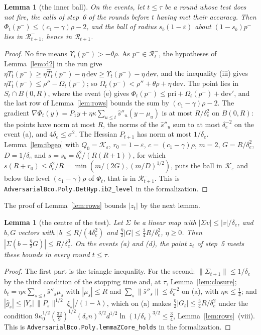 \documentclass[11pt]{amsart}
\newtheorem{lemma}[theorem]{Lemma}
\theoremstyle{definition}
\numberwithin{equation}{section}
\newcommand{\cK}{\mathcal{K}}
\begin{document}
\begin{lemma}[the inner ball]\label{lem:ib2}
On the events, let $t\le\tau$ be a round whose test does not fire, the calls of step~6 of the rounds before $t$ having met their accuracy. Then $\Phi_t(p^-)\le(c_1-\gamma)\rho-2$, and the ball of radius $s_b(1-\varepsilon)$ about $(1-s_b)p^-$ lies in $\mathcal R^-_{t+1}$, hence in $\mathcal R_{t+1}$.
\end{lemma}

\begin{proof}
No fire means $\Upsilon_t(p^-)>-\theta\rho$. As $p^-\in\mathcal R^-_t$, the hypotheses of Lemma~\ref{lem:d2} in the run give $\eta T_t(p^-)\ge\eta\hat T_t(p^-)-\eta\,\mathrm{dev}\ge\Upsilon_t(p^-)-\eta\,\mathrm{dev}$, and the inequality (iii) gives $\eta T_t(p^-)\le\rho''-\Omega_t(p^-)$; so $\Omega_t(p^-)<\rho''+\theta\rho+\eta\,\mathrm{dev}$. The point lies in $S_t\cap B(0,R)$, where the event (e) gives $\Phi_t(p^-)\le\mathrm{pri}+\Omega_t(p^-)+\mathrm{dev}'$, and the last row of Lemma~\ref{lem:rows} bounds the sum by $(c_1-\gamma)\rho-2$. The gradient $\nabla\Phi_t(y)=P_1y+\eta\kappa\sum_{u\le t}\hat s''_u(y-\mu_u)$ is at most $R/\delta_e^2$ on $B(0,R)$: the points have norm at most $R$, the norms of the $\hat s''_u$ sum to at most $\delta_e^{-2}$ on the event (a), and $4\delta_e\le\sigma^2$. The Hessian $P_{t+1}$ has norm at most $1/\delta_e$. Lemma~\ref{lem:ibgeo} with $Q_0=\cK_\varepsilon$, $r_0=1-\varepsilon$, $c=(c_1-\gamma)\rho$, $m=2$, $G=R/\delta_e^2$, $D=1/\delta_e$ and $s=s_b=\delta_e^2/(R(R+1))$, for which $s(R+r_0)\le\delta_e^2/R=\min(m/(2G),(m/D)^{1/2})$, puts the ball in $\cK_\varepsilon$ and below the level $(c_1-\gamma)\rho$ of $\Phi_t$, that is in $\mathcal R^-_{t+1}$.
This is \texttt{AdversarialBco.Poly.DetHyp.ib2\_level} in the formalization.
\end{proof}

The proof of Lemma~\ref{lem:rows} bounds $|z_t|$ by the next lemma.

\begin{lemma}[the centre of the test]\label{lem:z}
Let $\Sigma$ be a linear map with $|\Sigma v|\le|v|/\delta_e$, and $b,G$ vectors with $|b|\le R/(4\delta_e^2)$ and $\frac\eta2|G|\le\frac34R/\delta_e^2$, $\eta\ge0$. Then $|\Sigma(b-\frac\eta2G)|\le R/\delta_e^3$. On the events (a) and (d), the point $z_t$ of step~5 meets these bounds in every round $t\le\tau$.
\end{lemma}

\begin{proof}
The first part is the triangle inequality. For the second: $\|\Sigma_{t+1}\|\le1/\delta_e$ by the third condition of the stopping time and, at $\tau$, Lemma~\ref{lem:closure}; $b_t=\eta\kappa\sum_{s\le t}\hat s''_s\mu_s$ with $|\mu_s|\le R$ and $\sum_s\|\hat s''_s\|\le\delta_e^{-2}$ on (a), with $\eta\kappa\le\frac14$; and $|\hat g_s|\le|Y_s|\,\|P_s\|^{1/2}|\xi_s|/(1-\lambda)$, which on (a) makes $\frac\eta2|G_t|\le\frac34R/\delta_e^2$ under the condition $9\kappa_0^{1/2}(\frac{32}9)^{1/2}(\delta_en)^{3/2}d^{1/2}\ln(1/\delta_e)^{3/2}\le\frac34$, Lemma~\ref{lem:rows}~(viii).
This is \texttt{AdversarialBco.Poly.lemmaZCore\_holds} in the formalization.
\end{proof}
\end{document}
